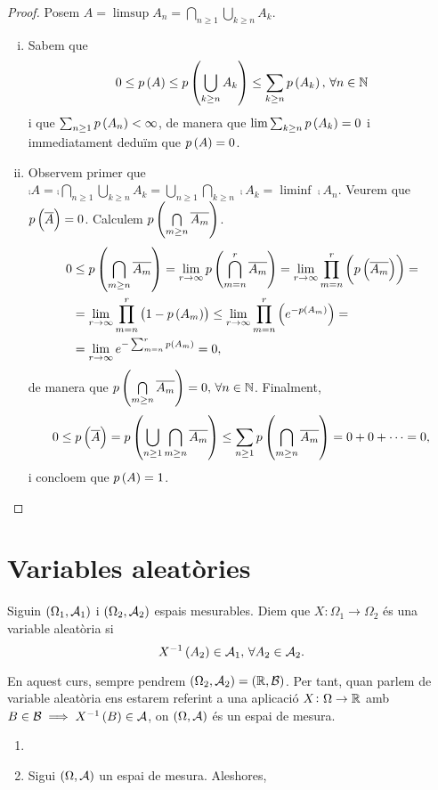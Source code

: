 \begin{proof}
    Posem $A=\limsup A_n=\bigcap\limits_{n\geq 1}\bigcup\limits_{k\geq n} A_k$.
    \begin{enumerate}[i)]
        \item Sabem que
            \[
                0\leq p\left( A\right)\leq p\left(\bigcup_{k\geq n}A_k\right)\leq\sum_{k\geq n} p\left( A_k\right) ,\,\forall n\in\mathbb{N}
            \]
            i que $\sum_{n\geq 1} p\left( A_n\right)<\infty$, de manera que $\lim \sum_{k\geq n} p\left( A_k\right)=0$ i immediatament deduïm que $p\left( A\right)=0$.
        \item Observem primer que $\comp{A}=\comp{\bigcap\limits_{n\geq 1}\bigcup\limits_{k\geq n} A_k}=\bigcup\limits_{n\geq 1}\bigcap\limits_{k\geq n} \comp{A_k}=\liminf\comp{A_n}$. Veurem que $p\left( \overline{A}\right)=0$. Calculem $p\left( \bigcap\limits_{m\geq n} \overline{A_m}\right)$.
        \begin{align*}
            0&\leq p\left( \bigcap\limits_{m\geq n} \overline{A_m}\right) = \lim_{r\to\infty} p\left( \bigcap\limits_{m= n}^r \overline{A_m}\right) = \lim_{r\to\infty} \prod_{m= n}^r \left( p\left(\overline{A_m}\right)\right) =\\
            &= \lim_{r\to\infty} \prod_{m= n}^r \left( 1-p\left( A_m\right)\right) \leq \lim_{r\to\infty} \prod_{m= n}^r \left( e^{-p\left( A_m\right)}\right) =\\
            &=\lim_{r\to\infty} e^{-\sum_{m= n}^r p\left( A_m\right)} = 0,
        \end{align*}
        de manera que $p\left( \bigcap\limits_{m\geq n} \overline{A_m}\right)=0, \,\forall n\in\mathbb{N}$.
        Finalment,
        \[
            0\leq p\left(\overline{A}\right)=p\left(\bigcup\limits_{n\geq 1}\bigcap\limits_{m\geq n} \overline{A_m}\right)\leq\sum_{n\geq 1}p\left(\bigcap\limits_{m\geq n} \overline{A_m}\right)=0+0+\cdots=0,
        \]
        i concloem que $p\left( A\right)=1$.
    \end{enumerate}
\end{proof}

\chapter{Variables aleatòries}
\begin{defi}
    Siguin $\left( \Omega_1, \mathcal{A}_1\right)$ i $\left( \Omega_2, \mathcal{A}_2\right)$ espais mesurables. Diem que $X\colon \Omega_1\to\Omega_2$ és una variable aleatòria si
    \[
        X^{-1}\left( A_2\right)\in\mathcal{A}_1,\,\forall A_2\in\mathcal{A}_2.
    \]
\end{defi}
\noindent En aquest curs, sempre pendrem $\left( \Omega_2, \mathcal{A}_2\right)=\left( \mathbb{R},\mathcal{B}\right)$. Per tant, quan parlem de variable aleatòria ens estarem referint a una aplicació $X\colon\Omega\to\mathbb{R}$ amb $B\in\mathcal{B}\implies X^{-1}\left( B\right)\in\mathcal{A}$, on $\left( \Omega, \mathcal{A}\right)$ és un espai de mesura.
\begin{example}
    \begin{enumerate}[1.]
        \item[]
        \item Sigui $\left( \Omega, \mathcal{A}\right)$ un espai de mesura. Aleshores,
    \end{enumerate}
\end{example}



